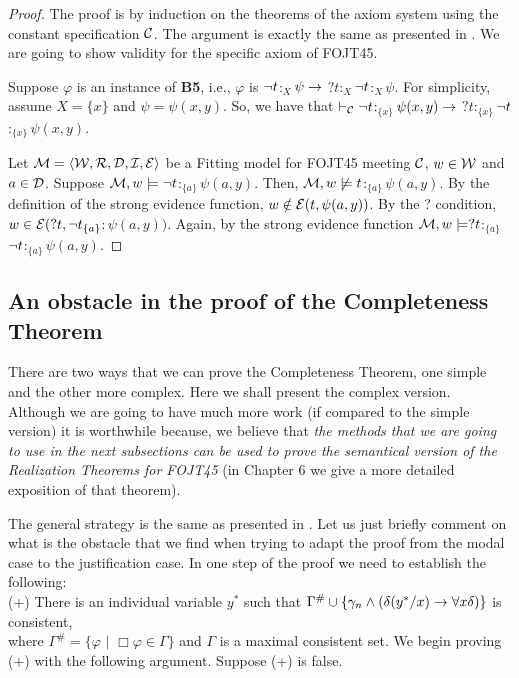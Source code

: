 \begin{proof}
	The proof is by induction on the theorems of the axiom system using the constant specification $\mathcal{C}$. The argument is exactly the same as presented in \cite[pp. 9-10]{Fitting14}. We are going to show validity for the specific axiom of FOJT45.
	
	\qquad Suppose $\varphi$ is an instance of \textbf{B5}, i.e., $\varphi$ is $\neg t$$:_{X}$$\psi \rightarrow$ $?t$$:_{X}$$\neg t$$:_{X}$$\psi$. For simplicity, assume $X= \{x\}$ and $\psi = \psi(x,y)$. So, we have that $\vdash_{\mathcal{C}}\neg t$$:_{\{x\}}$$\psi(x,y) \rightarrow$ $?t$$:_{\{x\}}$$\neg t$$:_{\{x\}}$$\psi(x,y)$.
	
	\qquad Let $\mathcal{M} = \langle\mathcal{W},\mathcal{R},\mathcal{D},\mathcal{I},\mathcal{E} \rangle$ be a Fitting model for FOJT45 meeting $\mathcal{C}$, $w \in \mathcal{W}$ and $a \in \mathcal{D}$. Suppose $\mathcal{M}, w \models \neg t$$:_{\{a\}}$$\psi(a,y)$. Then, $\mathcal{M}, w \not\models t$$:_{\{a\}}$$\psi(a,y)$. By the definition of the strong evidence function, $w \notin \mathcal{E} (t, \psi(a,y))$. By the ? condition, $w \in \mathcal{E}(?t,\neg t_{\{a\}}$$:\psi(a,y))$. Again, by the strong evidence function $\mathcal{M}, w \models ?t$$:_{\{a\}}$$\neg t$$:_{\{a\}}$$\psi(a,y)$.
	
\end{proof}


\subsection{An obstacle in the proof of the Completeness Theorem}

\qquad There are two ways that we can prove the Completeness Theorem, one simple and the other more complex. Here we shall present the complex version. Although we are going to have much more work (if compared to the simple version) it is worthwhile because, we believe that \textit{the methods that we are going to use in the next subsections can be used to prove the semantical version of the Realization Theorems for FOJT45} (in Chapter 6 we give a more detailed exposition of that theorem).   

\qquad The general strategy is the same as presented in \cite[pp. 256-265]{Hughes96}. Let us just briefly comment on what is the obstacle that we find when trying to adapt the proof from the modal case to the justification case. In one step of the proof \cite[pp. 259-260]{Hughes96} we need to establish the following: \\

(+) There is an individual variable $y^{*}$ such that $\Gamma^{\#} \cup \{ \gamma_{n} \wedge (\delta(y^{*}/ x) \rightarrow \forall x \delta) \}$ is consistent,\\ 
where $\Gamma^{\#} = \{\varphi$ $|$ $\Box \varphi \in \Gamma\}$ and $\Gamma$ is a maximal consistent set. We begin proving (+) with the following argument. Suppose (+) is false.

